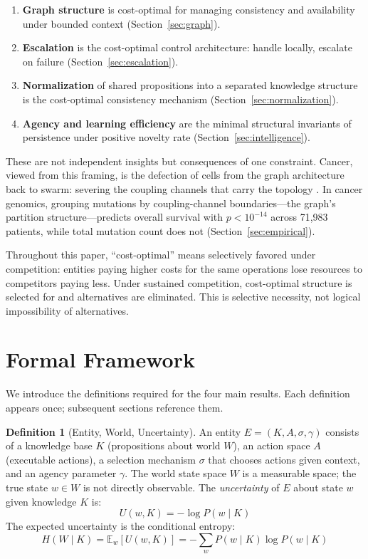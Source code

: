 \documentclass[11pt]{article}
\theoremstyle{definition}
\newtheorem{definition}{Definition}
\theoremstyle{remark}
\begin{document}
\begin{enumerate}
\item \textbf{Graph structure} is cost-optimal for managing consistency
   and availability under bounded context
   (Section~\ref{sec:graph}).
\item \textbf{Escalation} is the cost-optimal control architecture:
   handle locally, escalate on failure
   (Section~\ref{sec:escalation}).
\item \textbf{Normalization} of shared propositions into a separated
   knowledge structure is the cost-optimal consistency mechanism
   (Section~\ref{sec:normalization}).
\item \textbf{Agency and learning efficiency} are the minimal
   structural invariants of persistence under positive novelty rate
   (Section~\ref{sec:intelligence}).
\end{enumerate}

These are not independent insights but consequences of one constraint.
Cancer, viewed from this framing, is the defection of cells from the
graph architecture back to swarm: severing the coupling channels that
carry the topology \cite{McCarthy2026e}. In cancer genomics, grouping
mutations by coupling-channel boundaries---the graph's partition
structure---predicts overall survival with $p < 10^{-14}$ across
71,983 patients, while total mutation count does not
(Section~\ref{sec:empirical}).

Throughout this paper, ``cost-optimal'' means selectively favored under
competition: entities paying higher costs for the same operations lose
resources to competitors paying less. Under sustained competition,
cost-optimal structure is selected for and alternatives are eliminated.
This is selective necessity, not logical impossibility of alternatives.

\section{Formal Framework}
\label{sec:framework}

We introduce the definitions required for the four main results.
Each definition appears once; subsequent sections reference them.

\begin{definition}[Entity, World, Uncertainty]
\label{def:entity}
An entity $E = (K, A, \sigma, \gamma)$ consists of a knowledge base $K$
(propositions about world $W$), an action space $A$ (executable
actions), a selection mechanism $\sigma$ that chooses
actions given context, and an agency parameter $\gamma$. The world state space $W$ is a
measurable space; the true state $w \in W$ is not directly observable.
The \emph{uncertainty} of $E$ about state $w$ given knowledge $K$ is:
\[
U(w, K) = -\log P(w \mid K)
\]
The expected uncertainty is the conditional entropy:
\[
H(W \mid K) = \mathbb{E}_w[U(w, K)] = -\sum_w P(w \mid K) \log P(w \mid K)
\]
\end{definition}
\end{document}
